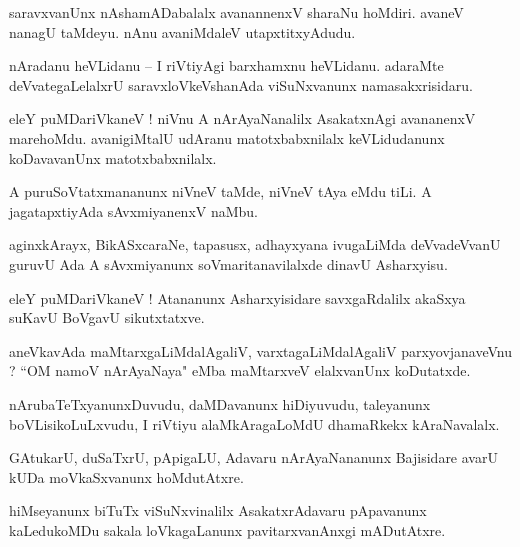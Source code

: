 \documentclass{article}
\begin{document}
\begin{mn}%
saravxvanUnx nAshamADabalalx avanannenxV sharaNu hoMdiri. avaneV nanagU taMdeyu. nAnu avaniMdaleV 
utapxtitxyAdudu.
\end{mn}

\begin{mn}%
nAradanu heVLidanu -- I riVtiyAgi barxhamxnu heVLidanu. adaraMte deVvategaLelalxrU 
saravxloVkeVshanAda viSuNxvanunx namasakxrisidaru.
\end{mn}

\begin{mn}%
eleY puMDariVkaneV ! niVnu A nArAyaNanalilx AsakatxnAgi avananenxV marehoMdu. avanigiMtalU udAranu 
matotxbabxnilalx keVLidudanunx koDavavanUnx matotxbabxnilalx.
\end{mn}

\begin{mn}%
A puruSoVtatxmananunx niVneV taMde, niVneV tAya eMdu tiLi. A jagatapxtiyAda sAvxmiyanenxV naMbu.
\end{mn}

\begin{mn}%
aginxkArayx, BikASxcaraNe, tapasusx, adhayxyana ivugaLiMda deVvadeVvanU guruvU Ada A sAvxmiyanunx 
soVmaritanavilalxde dinavU Asharxyisu.
\end{mn}

\begin{mn}%
eleY puMDariVkaneV ! Atananunx Asharxyisidare savxgaRdalilx akaSxya suKavU BoVgavU sikutxtatxve.
\end{mn}

\begin{mn}%
aneVkavAda maMtarxgaLiMdalAgaliV, varxtagaLiMdalAgaliV parxyovjanaveVnu ? ``OM namoV nArAyaNaya" 
eMba maMtarxveV elalxvanUnx koDutatxde.
\end{mn}

\begin{mn}%
nArubaTeTxyanunxDuvudu, daMDavanunx hiDiyuvudu, taleyanunx boVLisikoLuLxvudu, I riVtiyu 
alaMkAragaLoMdU dhamaRkekx kAraNavalalx.
\end{mn}

\begin{mn}%
GAtukarU, duSaTxrU, pApigaLU, Adavaru nArAyaNananunx Bajisidare avarU kUDa moVkaSxvanunx hoMdutAtxre.
\end{mn}

\begin{mn}%
hiMseyanunx biTuTx viSuNxvinalilx AsakatxrAdavaru pApavanunx kaLedukoMDu sakala loVkagaLanunx 
pavitarxvanAnxgi mADutAtxre.
\end{mn}
\end{document}
